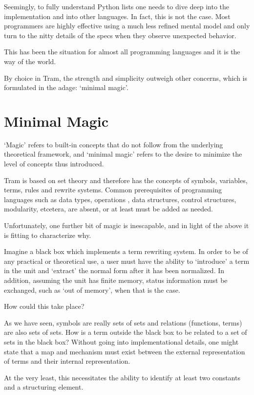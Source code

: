 \documentclass[11pt,twoside]{memoir}
\begin{document}
Seemingly, to fully understand Python lists one needs to dive deep into the implementation and into other languages. In fact, this is not the case. Most programmers are highly effective using a much less refined mental model and only turn to the nitty details of the specs when they observe unexpected behavior.

This has been the situation for almost all programming languages and it is the way of the world.

By choice in Tram, the strength and simplicity outweigh other concerns, which is formulated in the adage: `minimal magic'.

\section{Minimal Magic}
`Magic' refers to built-in concepts that do not follow from the underlying theoretical framework, and `minimal magic' refers to the desire to minimize the level of concepts thus introduced.

Tram is based on set theory and therefore has the concepts of symbols, variables, terms, rules and rewrite systems. Common prerequisites of programming languages such as data types, operations , data structures, control structures, modularity, etcetera, are absent, or at least must be added as needed.

Unfortunately, one further bit of magic is inescapable, and in light of the above it is fitting to characterize why.

Imagine a black box which implements a term rewriting system. In order to be of any practical or theoretical use, a user must have the ability to `introduce' a term in the unit and `extract' the normal form after it has been normalized. In addition, assuming the unit has finite memory, status information must be exchanged, such as `out of memory', when that is the case.

How could this take place?

As we have seen, symbols are really sets of sets and relations (functions, terms) are also sets of sets. How is a term outside the black box to be related to a set of sets in the black box? Without going into implementational details, one might state that a map and mechanism must exist between the external representation of terms and their internal representation. 

At the very least, this necessitates the ability to identify at least two constants and a structuring element.
\end{document}
